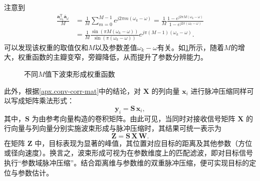 注意到
\[
    \begin{split}
        \frac{\bm{a}_{\omega_k}^{\mathrm{T}} \overline{\bm{a}}_{\omega}}{M} & = \frac{1}{M} \sum_{m=0}^{M-1} e^{j 2 \pi m (\omega_k - \omega)} = \frac{1}{M} \frac{1 - e^{j 2 \pi M (\omega_k - \omega)}}{1 - e^{j 2 \pi (\omega_k - \omega)}} \\
                                                                            & = \frac{1}{M} \frac{\sin(\pi M (\omega_k - \omega))}{\sin(\pi (\omega_k - \omega))} e^{j \pi (M-1)(\omega_k - \omega)}.
    \end{split}
\]
可以发现该权重的取值仅和\( M \)以及参数差值\( \omega_k - \omega \)有关。如\cref{fig_weight}所示，随着\( M \)的增大，权重函数的主瓣变窄，旁瓣降低，从而提升了参数分辨能力。

\begin{figure}[htb!]
    \centering
    \caption{不同\( M \)值下波束形成权重函数}
    \label{fig_weight}
\end{figure}

此外，根据\cref{apx.conv-corr-mat}中的结论，对 $\mathbf{X}$ 的列向量 $\bm{x}_i$ 进行脉冲压缩同样可以写成矩阵乘法形式：
\begin{equation}
    \bm{y}_i = \mathbf{S}\,\bm{x}_i,
\end{equation}
其中，$\mathbf{S}$ 为由参考向量构造的卷积矩阵。由此可见，当同时对接收信号矩阵 $\mathbf{X}$ 的行向量与列向量分别实施波束形成与脉冲压缩时，其结果可统一表示为
\begin{equation}
    \mathbf{Z} = \mathbf{S}\,\mathbf{X}\,\mathbf{W}.
\end{equation}
在矩阵 $\mathbf{Z}$ 中，目标表现为显著的峰值，其位置对应目标的距离及其他参数（方位或径向速度）。换言之，波束形成可视为在参数维度上的匹配滤波，即对目标信号执行``参数域脉冲压缩''。结合距离维与参数维的双重脉冲压缩，便可实现目标的定位与参数估计。

